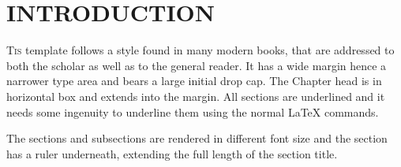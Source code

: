 
         
 \def\@seccntformat#1{\protect\makebox[0pt][l]{\csname the#1\endcsname}}
\def\thesection{%
   \raisebox{-6.5pt}{\tikzrule}%
}%
\def\thechapter{\@gobble}   
\makeatother
\section{INTRODUCTION}
 \pagestyle{verticalrule} 
 
\renewcommand{\DefaultLoversize}{0.3}
\renewcommand{\LettrineTextFont}{\fontfamily{Minion Pro}\normalfont\scshape}
\renewcommand{\LettrineFontHook}{%
\fontseries{bx}\fontshape{up}\color{gray}}



\lettrine[lraise=0.0, nindent=0em, slope=-.5em]{T}{is} template follows a style found in many modern books,
that are addressed to both the scholar as well as to the general reader. It has a wide margin hence a narrower type area and bears a large initial drop cap. The Chapter head is in horizontal box and extends into the margin. All sections are underlined and it needs some ingenuity to underline them using the normal LaTeX commands. 


\medskip

\begin{figure}[bt]
\hspace{\the\marginparsep}
\par
\end{figure}


\example The sections and subsections are rendered in different font size and the section has a ruler underneath, extending the full length of the section title.




